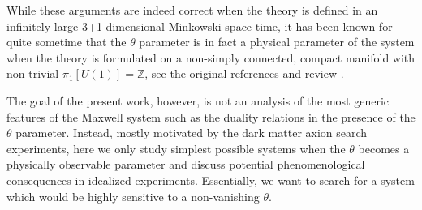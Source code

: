 \documentclass[ twocolumn,aps,prd,   
               preprintnumbers,numbers,sort&compress,nofootinbib,
                            showpacs,superscriptaddress,
               colorlinks,
               linkcolor=blue,   
               citecolor=blue]{revtex4-1}   \newcommand{\exclude}[1]{}
\begin{document}
While these arguments are indeed correct when the  theory is defined in an infinitely large 3+1 dimensional Minkowski space-time, 
it has been known for quite sometime that 
the $\theta$ parameter is in fact a physical parameter of the system when the theory is formulated  on a non-simply connected, compact manifold with 
non-trivial    $\pi_1[U(1)]=\mathbb{Z}$, see the original references  \cite{Witten:1995gf,Verlinde:1995mz} and review \cite{Olive:2000yy}. 

The  goal of the present work, however,  is not   an analysis of  the most  generic features of the Maxwell system such as the  duality relations in the presence of the $\theta$ parameter. Instead, mostly motivated by the dark matter axion search experiments,
here we only study simplest possible systems 
when the $\theta$ becomes a physically observable  parameter and discuss potential phenomenological consequences in idealized experiments. 
 Essentially, we want to search for   a system which would be highly sensitive to a  non-vanishing $\theta$. 
\end{document}
